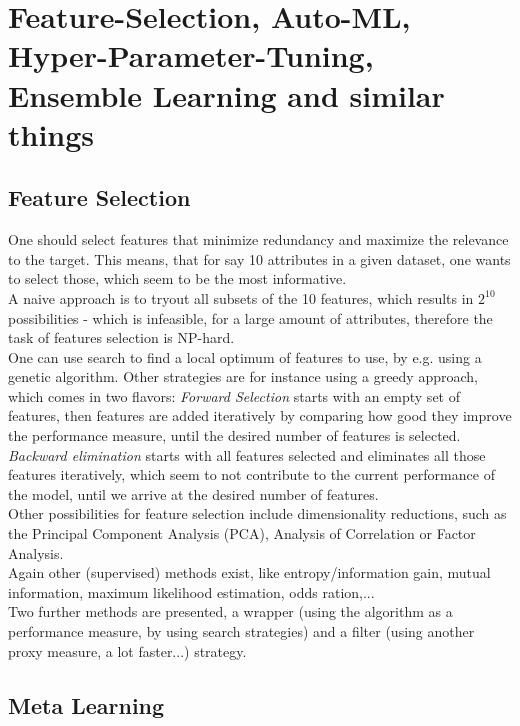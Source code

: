 \documentclass[12pt,a4paper]{article}
\begin{document}
\newpage
\section{Feature-Selection, Auto-ML, Hyper-Parameter-Tuning, Ensemble Learning and similar things}

\subsection{Feature Selection}

\noindent One should select features that minimize redundancy and maximize the relevance to the target. This means, that for say 10 attributes in a given dataset, one wants to select those, which seem to be the most informative.\\
A naive approach is to tryout all subsets of the 10 features, which results in \(2^{10}\) possibilities - which is infeasible, for a large amount of attributes, therefore the task of features selection is NP-hard.\\[1em]
One can use search to find a local optimum of features to use, by e.g. using a genetic algorithm. Other strategies are for instance using a greedy approach, which comes in two flavors: \textit{Forward Selection} starts with an empty set of features, then features are added iteratively by comparing how good they improve the performance measure, until the desired number of features is selected.\\
\textit{Backward elimination} starts with all features selected and eliminates all those features iteratively, which seem to not contribute to the current performance of the model, until we arrive at the desired number of features.\\[1em]
Other possibilities for feature selection include dimensionality reductions, such as the Principal Component Analysis (PCA), Analysis of Correlation or Factor Analysis.\\
Again other (supervised) methods exist, like entropy/information gain, mutual information, maximum likelihood estimation, odds ration,...\\[1em]
Two further methods are presented, a wrapper (using the algorithm as a performance measure, by using search strategies) and a filter (using another proxy measure, a lot faster...) strategy.\\


\subsection{Meta Learning}
\end{document}
